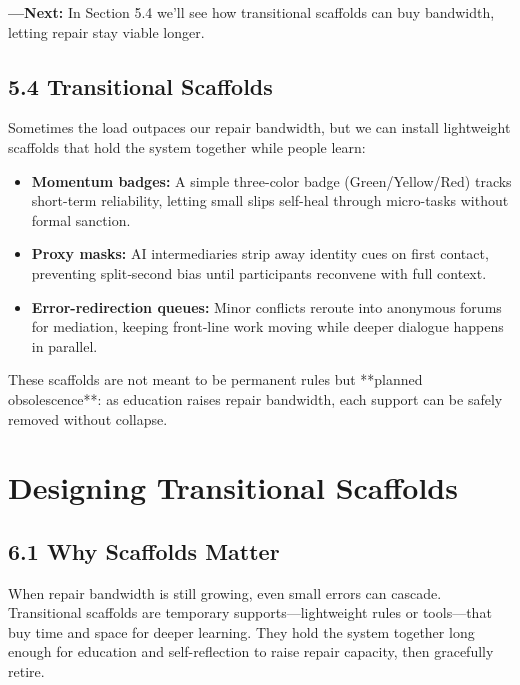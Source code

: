 \documentclass{book}       %
\begin{document}
\bigskip
\noindent\textbf{—Next:}  
In Section 5.4 we’ll see how transitional scaffolds can buy bandwidth, letting repair stay viable longer.



\section*{5.4  Transitional Scaffolds}

Sometimes the load outpaces our repair bandwidth, but we can install lightweight scaffolds that hold the system together while people learn:

\begin{itemize}[noitemsep]
  \item \textbf{Momentum badges:}  
    A simple three-color badge (Green/Yellow/Red) tracks short-term reliability, 
    letting small slips self-heal through micro-tasks without formal sanction.
  \item \textbf{Proxy masks:}  
    AI intermediaries strip away identity cues on first contact, preventing split‐second bias 
    until participants reconvene with full context.
  \item \textbf{Error-redirection queues:}  
    Minor conflicts reroute into anonymous forums for mediation, keeping front‐line work moving 
    while deeper dialogue happens in parallel.
\end{itemize}

These scaffolds are not meant to be permanent rules but **planned obsolescence**:  
as education raises repair bandwidth, each support can be safely removed without collapse.



\chapter{Designing Transitional Scaffolds}

\section*{6.1  Why Scaffolds Matter}
When repair bandwidth is still growing, even small errors can cascade.  
Transitional scaffolds are temporary supports—lightweight rules or tools—that buy time and space for deeper learning.  
They hold the system together long enough for education and self-reflection to raise repair capacity, then gracefully retire.
\end{document}
